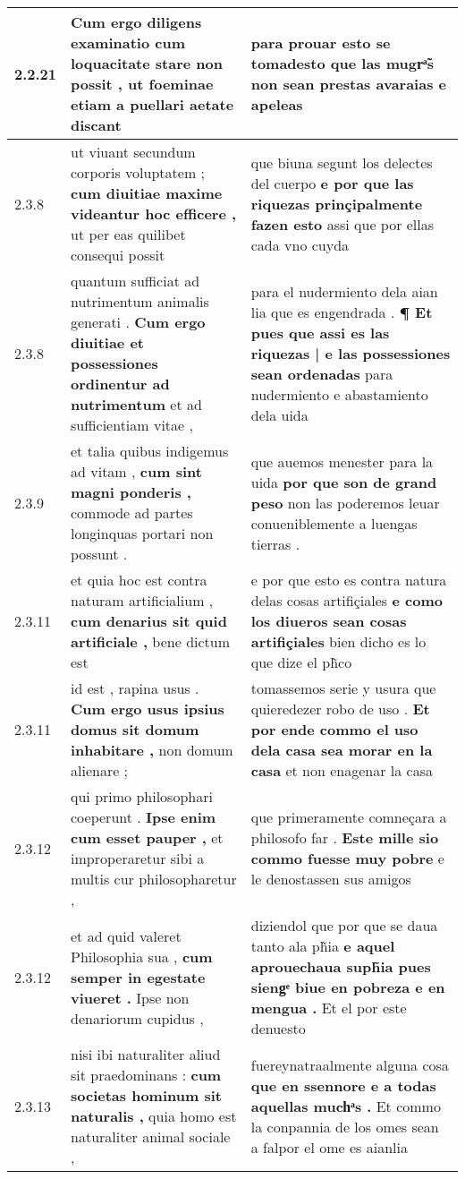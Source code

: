 \begin{tabular}{|p{1cm}|p{6.5cm}|p{6.5cm}|}
2.2.21 & Cum ergo diligens examinatio \textbf{ cum loquacitate stare non possit , } ut foeminae etiam a puellari aetate discant & para prouar esto se \textbf{ tomadesto } que las mugrͣ̃s non sean prestas avaraias e apeleas \\\hline
2.3.8 & ut viuant secundum corporis voluptatem ; \textbf{ cum diuitiae maxime videantur hoc efficere , } ut per eas quilibet consequi possit & que biuna segunt los delectes del cuerpo \textbf{ e por que las riquezas prinçipalmente fazen esto } assi que por ellas cada vno cuyda \\\hline
2.3.8 & quantum sufficiat ad nutrimentum animalis generati . \textbf{ Cum ergo diuitiae et possessiones ordinentur ad nutrimentum } et ad sufficientiam vitae , & para el nudermiento dela aian lia que es engendrada . \textbf{ ¶ Et pues que assi es las riquezas | e las possessiones sean ordenadas } para nudermiento e abastamiento dela uida \\\hline
2.3.9 & et talia quibus indigemus ad vitam , \textbf{ cum sint magni ponderis , } commode ad partes longinquas portari non possunt . & que auemos menester para la uida \textbf{ por que son de grand peso } non las poderemos leuar conueniblemente a luengas tierras . \\\hline
2.3.11 & et quia hoc est contra naturam artificialium , \textbf{ cum denarius sit quid artificiale , } bene dictum est & e por que esto es contra natura delas cosas artifiçiales \textbf{ e como los diueros sean cosas artifiçiales } bien dicho es lo que dize el ph̃co \\\hline
2.3.11 & id est , rapina usus . \textbf{ Cum ergo usus ipsius domus sit domum inhabitare , } non domum alienare ; & tomassemos serie y usura que quieredezer robo de uso . \textbf{ Et por ende commo el uso dela casa sea morar en la casa } et non enagenar la casa \\\hline
2.3.12 & qui primo philosophari coeperunt . \textbf{ Ipse enim cum esset pauper , } et improperaretur sibi a multis cur philosopharetur , & que primeramente comneçara a philosofo far . \textbf{ Este mille sio commo fuesse muy pobre } e le denostassen sus amigos \\\hline
2.3.12 & et ad quid valeret Philosophia sua , \textbf{ cum semper in egestate viueret . } Ipse non denariorum cupidus , & diziendol que por que se daua tanto ala ph̃ia \textbf{ e aquel aprouechaua suph̃ia pues siengͤ biue en pobreza e en mengua . } Et el por este denuesto \\\hline
2.3.13 & nisi ibi naturaliter aliud sit praedominans : \textbf{ cum societas hominum sit naturalis , } quia homo est naturaliter animal sociale , & fuereynatraalmente alguna cosa \textbf{ que en ssennore e a todas aquellas muchͣs . } Et commo la conpannia de los omes sean a falpor el ome es aianlia \\\hline

\end{tabular}
